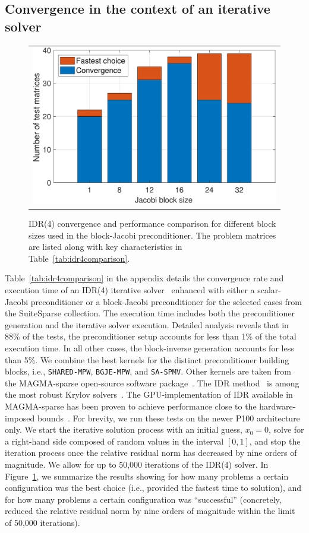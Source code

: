 \subsection{Convergence in the context of an iterative solver}
\begin{figure}
\begin{center}
\begin{tabular}{c}
\includegraphics[width=.46\columnwidth]{plots/solverperformance_bs.pdf}
\end{tabular}
\end{center}
\caption{
IDR(4) convergence and performance comparison for different block sizes used in the block-Jacobi preconditioner. 
The problem matrices are listed along with key characteristics in Table~\ref{tab:idr4comparison}.
}
\label{fig:solverperformance}
\end{figure}

Table~\ref{tab:idr4comparison} in the appendix details the convergence rate and
execution time of an IDR(4) iterative solver~\cite{idr1} enhanced with either a
scalar-Jacobi preconditioner or a block-Jacobi preconditioner for the selected
cases from the SuiteSparse collection. The execution time includes both the
preconditioner generation and the iterative solver execution. 
Detailed analysis reveals that in 88\% of the tests, the preconditioner setup
accounts for less than 1\% of the total execution time. In all other cases, the
block-inverse generation accounts for less than 5\%.
We combine the best
kernels for the distinct preconditioner building blocks, i.e., {\tt SHARED-MPW},
{\tt BGJE-MPW}, and {\tt SA-SPMV}. Other kernels are taken from the MAGMA-sparse
open-source software package~\cite{magma}. The IDR method~\cite{idr} is among the 
most robust Krylov solvers~\cite{ashes2016}. The GPU-implementation of IDR available in
MAGMA-sparse has been proven to achieve performance close to the hardware-imposed
bounds~\cite{ijhpca2016}. For brevity, we run these tests on the newer P100
architecture only. We start the iterative solution process with an initial guess, 
$x_0=0$, solve for a right-hand side composed of random values in the interval
$[0,1]$, and stop the iteration process once the relative residual norm has
decreased by nine orders of magnitude. We allow for up to 50,000 iterations of
the IDR(4) solver. In Figure~\ref{fig:solverperformance}, we summarize the
results showing for how many problems a certain configuration was the best
choice (i.e., provided the fastest time to solution), and for how many problems
a certain configuration was ``successful'' (concretely, reduced the relative
residual norm by nine orders of magnitude within the limit of 50,000
iterations).


